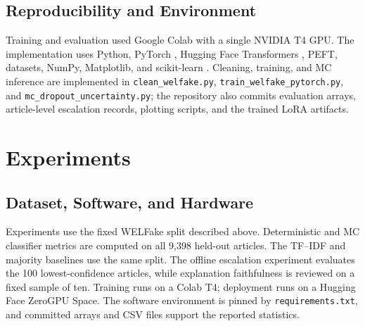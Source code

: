 \documentclass[10pt,twocolumn,letterpaper]{article}
\begin{document}
\subsection{Reproducibility and Environment}
Training and evaluation used Google Colab with a single NVIDIA T4 GPU. The
implementation uses Python, PyTorch \cite{paszke2019pytorch}, Hugging Face
Transformers \cite{wolf2020transformers}, PEFT, datasets, NumPy, Matplotlib, and
scikit-learn \cite{pedregosa2011scikit}. Cleaning, training, and MC inference are
implemented in \texttt{clean\_welfake.py},
\texttt{train\_welfake\_pytorch.py}, and
\texttt{mc\_dropout\_uncertainty.py}; the repository also commits evaluation
arrays, article-level escalation records, plotting scripts, and the trained LoRA
artifacts.

\section{Experiments}
\subsection{Dataset, Software, and Hardware}
Experiments use the fixed WELFake split described above. Deterministic and MC
classifier metrics are computed on all 9{,}398 held-out articles. The TF--IDF and
majority baselines use the same split. The offline escalation experiment evaluates
the 100 lowest-confidence articles, while explanation faithfulness is reviewed on
a fixed sample of ten. Training runs on a Colab T4; deployment runs on a Hugging
Face ZeroGPU Space. The software environment is pinned by
\texttt{requirements.txt}, and committed arrays and CSV files support the reported
statistics.
\end{document}
